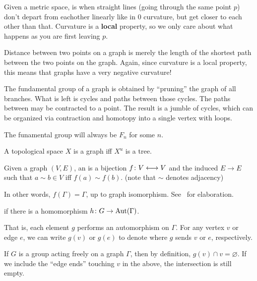\documentclass[11pt,leqno,oneside]{amsart}
\newenvironment{dateenv}{
  \vspace{1em}
}{
  \vspace{1em}
}
\newcommand{\mydate}[4]{
  \newdate{#1}{#2}{#3}{#4}
  \begin{dateenv}
    \hfill\displaydate{#1}
  \end{dateenv}
}
\numberwithin{thm}{section}
\renewcommand{\null}{\varnothing}
\newcommand{\adj}{\sim} %
\begin{document}
\mydate{d11}{20}{2}{2017}

\mydate{d12}{22}{2}{2017}

\begin{defn}
  Given a metric space,  is when straight lines (going through the same point $p$) don't depart from eachother linearly like in 0 curvature, but get closer to each other than that.  Curvature is a \textbf{local} property, so we only care about what happens as you are first leaving $p$.
\end{defn}

Distance between two points on a graph is merely the length of the shortest path between the two points on the graph.  Again, since curvature is a local property, this means that graphs have a very negative curvature!

\begin{thm}
  The fundamental group of a graph is obtained by ``pruning'' the graph of all branches.  What is left is cycles and paths between those cycles.  The paths between may be contracted to a point.  The result is a jumble of cycles, which can be organized via contraction and homotopy into a single vertex with loops.

  The funamental group will always be $F_n$ for some $n$.
\end{thm}
\begin{thm}
  A topological space $X$ is a graph iff $X^u$ is a tree.
\end{thm}
\begin{defn}
  Given a graph $(V, E)$, an  is a bijection $f \colon V \longleftrightarrow V$ and the induced $E \to E$ such that $a \adj b \in V$ iff $f(a) \adj f(b)$.  (note that $\adj$ denotes adjacency)
\end{defn}
\begin{rmk}
  In other words, $f(\Gamma) = \Gamma$, up to graph isomorphism.  See~\cite{GA} for elaboration.
\end{rmk}
\begin{defn}
   if there is a homomorphism $h \colon G \to \operatorname{Aut}(\Gamma)$.
\end{defn}
\begin{rmk}
  That is, each element $g$ performs an automorphism on $\Gamma$.  For any vertex $v$ or edge $e$, we can write $g(v)$ or $g(e)$ to denote where $g$ sends $v$ or $e$, respectively.
\end{rmk}

If $G$ is a group acting freely on a graph $\Gamma$, then by definition, $g(v) \cap v = \null$.  If we include the ``edge ends'' touching $v$ in the above, the intersection is still empty.
\end{document}
